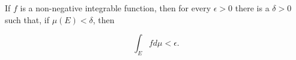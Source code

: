 If $f$ is a non-negative integrable function, then for every $\epsilon > 0$ there is a $\delta > 0$ such that, if $\mu(E) < \delta$, then

$$\int_E f d\mu < \epsilon.$$
